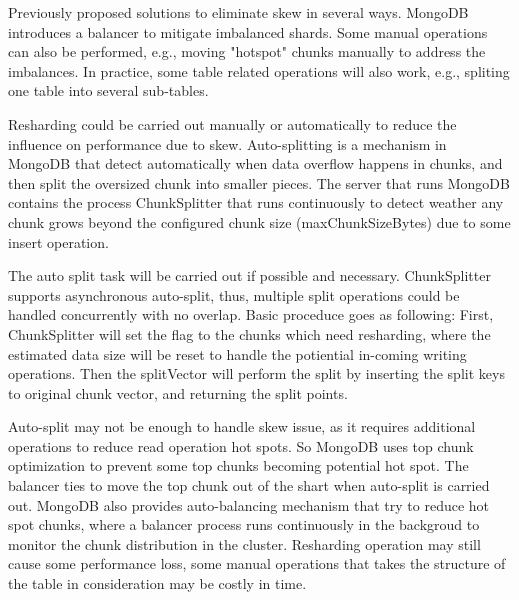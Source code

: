 \documentclass[a4paper,10pt,twoside]{article}
\begin{document}
Previously proposed solutions to eliminate skew in several ways.
MongoDB introduces a balancer to mitigate imbalanced shards\cite{MongoDB_balancing1}.
Some manual operations can also be performed, e.g., moving "hotspot" chunks manually to address the imbalances. 
In practice, some table related operations will also work, e.g., spliting one table into several sub-tables.
\par
Resharding could be carried out manually or automatically to reduce the influence on performance due to skew.
Auto-splitting is a mechanism in MongoDB\cite{MongoDB_sharding1} that detect automatically when data overflow happens in chunks, 
and then split the oversized chunk into smaller pieces.
The server that runs MongoDB contains the process ChunkSplitter that runs continuously to detect weather any chunk grows beyond the configured chunk size (maxChunkSizeBytes) due to some insert operation.
\par
The auto split task will be carried out if possible and necessary. ChunkSplitter supports asynchronous auto-split, thus, 
multiple split operations could be handled concurrently with no overlap. 
Basic proceduce goes as following: 
First, ChunkSplitter will set the flag to the chunks which need resharding, where the estimated data size will be reset to handle the potiential in-coming writing operations.
Then the splitVector will perform the split by inserting the split keys to original chunk vector, and returning the split points.
\par
Auto-split may not be enough to handle skew issue, as it requires additional operations to reduce read operation hot spots.
So MongoDB uses top chunk optimization to prevent some top chunks becoming potential hot spot.
The balancer ties to move the top chunk out of the shart when auto-split is carried out.
MongoDB also provides auto-balancing mechanism that try to reduce hot spot chunks, where a balancer process runs continuously in the backgroud to monitor the chunk distribution in the cluster.
Resharding operation may still cause some performance loss, some manual operations that takes the structure of the table in consideration may be costly in time.
\end{document}
